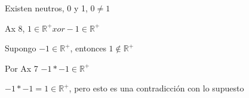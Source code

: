 \documentclass[10pt]{article}
\begin{document}
\begin{prf}[$1 \in \mathbb{R}^{+}$]{}

Existen neutros, 0 y 1, $0 \neq 1$

Ax 8, $1 \in \mathbb{R^{+}} xor -1 \in \mathbb{R^{+}}$

Supongo $-1 \in \mathbb{R^{+}}$, entonces $1 \notin \mathbb{R^{+}}$

Por Ax 7 $-1 * -1 \in \mathbb{R^{+}}$

$-1 * -1 = 1 \in \mathbb{R^{+}}$, pero esto es una contradicción con lo supuesto
\end{prf}
\end{document}
